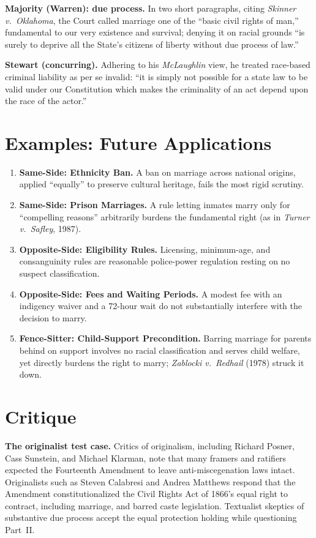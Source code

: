 \documentclass[12pt]{article}
\begin{document}
\textbf{Majority (Warren): due process.} In two short paragraphs, citing \textit{Skinner v.\ Oklahoma}, the Court called marriage one of the ``basic civil rights of man,'' fundamental to our very existence and survival; denying it on racial grounds ``is surely to deprive all the State's citizens of liberty without due process of law.''

\textbf{Stewart (concurring).} Adhering to his \textit{McLaughlin} view, he treated race-based criminal liability as per se invalid: ``it is simply not possible for a state law to be valid under our Constitution which makes the criminality of an act depend upon the race of the actor.''

\section{Examples: Future Applications}

\begin{enumerate}
\item \textbf{Same-Side: Ethnicity Ban.} A ban on marriage across national origins, applied ``equally'' to preserve cultural heritage, fails the most rigid scrutiny.
\item \textbf{Same-Side: Prison Marriages.} A rule letting inmates marry only for ``compelling reasons'' arbitrarily burdens the fundamental right (as in \textit{Turner v.\ Safley}, 1987).
\item \textbf{Opposite-Side: Eligibility Rules.} Licensing, minimum-age, and consanguinity rules are reasonable police-power regulation resting on no suspect classification.
\item \textbf{Opposite-Side: Fees and Waiting Periods.} A modest fee with an indigency waiver and a 72-hour wait do not substantially interfere with the decision to marry.
\item \textbf{Fence-Sitter: Child-Support Precondition.} Barring marriage for parents behind on support involves no racial classification and serves child welfare, yet directly burdens the right to marry; \textit{Zablocki v.\ Redhail} (1978) struck it down.
\end{enumerate}

\section{Critique}

\textbf{The originalist test case.} Critics of originalism, including Richard Posner, Cass Sunstein, and Michael Klarman, note that many framers and ratifiers expected the Fourteenth Amendment to leave anti-miscegenation laws intact. Originalists such as Steven Calabresi and Andrea Matthews respond that the Amendment constitutionalized the Civil Rights Act of 1866's equal right to contract, including marriage, and barred caste legislation. Textualist skeptics of substantive due process accept the equal protection holding while questioning Part~II.
\end{document}
